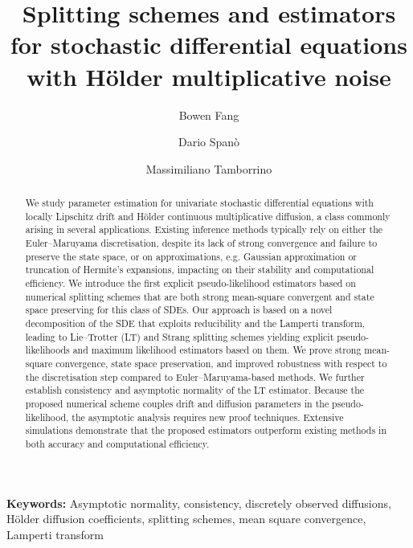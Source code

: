 \documentclass[a4paper,12pt]{article}
\numberwithin{equation}{section}
\theoremstyle{plain}
\theoremstyle{definition}
\providecommand{\keywords}[1]
{
  \small	
  \textbf{Keywords:} #1
}
\begin{document}
\title{Splitting schemes and estimators for stochastic differential equations with H\"older multiplicative noise}
\author[1]{Bowen Fang}
\author[1]{Dario Span\`o}
\author[1]{Massimiliano Tamborrino}
\maketitle

\begin{abstract}
We study parameter estimation for univariate stochastic differential equations with locally Lipschitz drift and Hölder continuous multiplicative diffusion, a class commonly arising in several applications. Existing inference methods typically rely on either the Euler–Maruyama discretisation, despite its lack of strong convergence and failure to preserve the state space, or on approximations, e.g. Gaussian approximation or truncation of Hermite's expansions, impacting on their stability and computational efficiency. We introduce the first explicit pseudo-likelihood estimators based on numerical splitting schemes that are both strong mean-square convergent and state space preserving for this class of SDEs. Our approach is based on a novel decomposition of the SDE that exploits reducibility and the Lamperti transform, leading to Lie–Trotter (LT) and Strang splitting schemes yielding explicit pseudo-likelihoods and maximum likelihood estimators based on them. We prove strong mean-square convergence, state space preservation, and improved robustness with respect to the discretisation step compared to Euler–Maruyama-based methods.
We further establish consistency and asymptotic normality of the LT estimator. Because the proposed numerical scheme couples drift and diffusion parameters in the pseudo-likelihood, the asymptotic analysis requires new proof techniques. Extensive simulations demonstrate that the proposed estimators outperform existing methods in both accuracy and computational efficiency.
\end{abstract}
\noindent\keywords{Asymptotic normality, consistency, 
discretely observed diffusions, Hölder diffusion coefficients, splitting schemes, mean square convergence, Lamperti transform}
\end{document}
